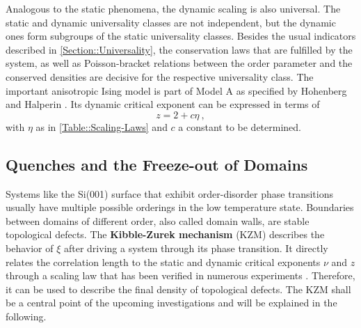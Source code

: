 	Analogous to the static phenomena, the dynamic scaling is also universal. The static and dynamic universality classes are not independent, but the dynamic ones form subgroups of the static universality classes. Besides the usual indicators described in \autoref{Section::Universality}, the conservation laws that are fulfilled by the system, as well as Poisson-bracket relations between the order parameter and the conserved densities are decisive for the respective universality class. The important anisotropic Ising model is part of Model A as specified by Hohenberg and Halperin \cite{hohenberg1977theory}. Its dynamic critical exponent can be expressed in terms of
	\begin{equation} \label{Eq::Model-A-z}
		z =	2 + c \eta ~,
	\end{equation}
	with $\eta$ as in \autoref{Table::Scaling-Laws} and $c$ a constant to be determined.
	\subsection{Quenches and the Freeze-out of Domains} \label{Section::Quenches}
	Systems like the Si(001) surface that exhibit order-disorder phase transitions usually have multiple possible orderings in the low temperature state. Boundaries between domains of different order, also called domain walls, are stable topological defects. The \textbf{Kibble-Zurek mechanism} (KZM) \cite{kibble1976topology, zurek1985cosmological, zurek1996cosmological} describes the behavior of $\xi$ after driving a system through its phase transition. It directly relates the correlation length to the static and dynamic critical exponents $\nu$ and $z$ through a scaling law that has been verified in numerous experiments \cite{ruutu1996vortex, ulm2013observation, pyka2013topological}. Therefore, it can be used to describe the final density of topological defects. The KZM shall be a central point of the upcoming investigations and will be explained in the following. \\
	
